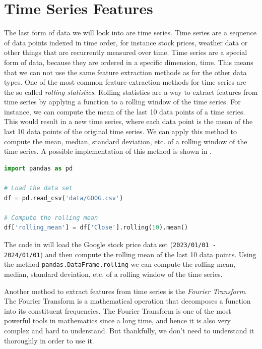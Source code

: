 \section{Time Series Features}
The last form of data we will look into are time series.
Time series are a sequence of data points indexed in time order, for instance stock prices, weather data or other things that are recurrently measured over time.
Time series are a special form of data, because they are ordered in a specific dimension, time.
This means that we can not use the same feature extraction methods as for the other data types.
One of the most common feature extraction methods for time series are the so called \textit{rolling statistics}.
Rolling statistics are a way to extract features from time series by applying a function to a rolling window of the time series.
For instance, we can compute the mean of the last 10 data points of a time series.
This would result in a new time series, where each data point is the mean of the last 10 data points of the original time series.
We can apply this method to compute the mean, median, standard deviation, etc. of a rolling window of the time series.
A possible implementation of this method is shown in .
\begin{lstlisting}[language=Python, caption={Rolling statistics example}, label={code:rolling-statistics}]
import pandas as pd

# Load the data set
df = pd.read_csv('data/GOOG.csv')

# Compute the rolling mean
df['rolling_mean'] = df['Close'].rolling(10).mean()
\end{lstlisting}
The code in  will load the Google stock price data set (\lstinline{2023/01/01 - 2024/01/01}) and then compute the rolling mean of the last 10 data points.
Using the method \lstinline{pandas.DataFrame.rolling} we can compute the rolling mean, median, standard deviation, etc. of a rolling window of the time series.

Another method to extract features from time series is the \textit{Fourier Transform}.
The Fourier Transform is a mathematical operation that decomposes a function into its constituent frequencies.
The Fourier Transform is one of the most powerful tools in mathematics since a long time, and hence it is also very complex and hard to understand.
But thankfully, we don't need to understand it thoroughly in order to use it.

